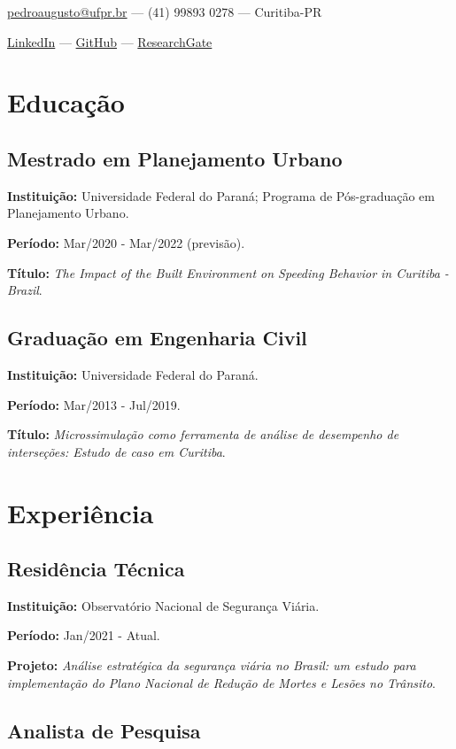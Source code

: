 \documentclass[12pt, a4paper]{article}
\author{Pedro Augusto Borges dos Santos}
\makeatletter
\renewcommand{\maketitle}{
   \begin{center}
      \large
      \textbf{\theauthor}
      \small
      \vspace{5pt}

      \href{mailto:pedroaugusto@ufpr.br}{pedroaugusto@ufpr.br} --- (41) 99893 0278 --- Curitiba-PR
      \par \href{https://www.linkedin.com/in/pabsantos/}{LinkedIn} --- \href{https://github.com/pabsantos}{GitHub} --- \href{https://www.researchgate.net/profile/Pedro-Santos-145}{ResearchGate}
   \end{center}
   }
\makeatother
\begin{document}
\maketitle

\section{Educação}

\subsection{Mestrado em Planejamento Urbano}

\textbf{Instituição:} Universidade Federal do Paraná; Programa de Pós-graduação em Planejamento Urbano.

\textbf{Período:} Mar/2020 - Mar/2022 (previsão).

\textbf{Título:} \textit{The Impact of the Built Environment on Speeding Behavior in Curitiba - Brazil}.

\subsection{Graduação em Engenharia Civil}

\textbf{Instituição:} Universidade Federal do Paraná.

\textbf{Período:} Mar/2013 - Jul/2019.

\textbf{Título:} \textit{Microssimulação como ferramenta de análise de desempenho de interseções: Estudo de caso em Curitiba}.

\section{Experiência}

\subsection{Residência Técnica}

\textbf{Instituição:} Observatório Nacional de Segurança Viária.

\textbf{Período:} Jan/2021 - Atual.

\textbf{Projeto:} \textit{Análise estratégica da segurança viária no Brasil: um estudo para implementação do Plano Nacional de Redução de Mortes e Lesões no Trânsito}.

\subsection{Analista de Pesquisa}
\end{document}

